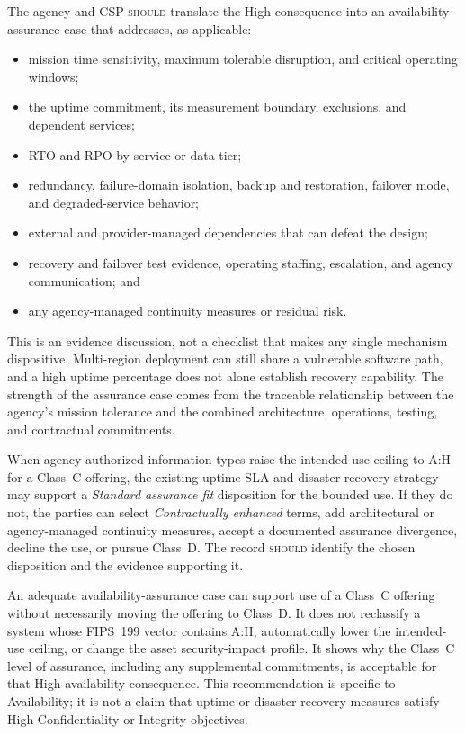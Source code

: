 \documentclass[11pt]{article}
\newcommand{\rfckw}[1]{\textsc{#1}}
\begin{document}
The agency and CSP \rfckw{should} translate the High consequence into an
availability-assurance case that addresses, as applicable:

\begin{itemize}[leftmargin=1.5em]
\item mission time sensitivity, maximum tolerable disruption, and critical
  operating windows;
\item the uptime commitment, its measurement boundary, exclusions, and dependent
  services;
\item RTO and RPO by service or data tier;
\item redundancy, failure-domain isolation, backup and restoration, failover mode,
  and degraded-service behavior;
\item external and provider-managed dependencies that can defeat the design;
\item recovery and failover test evidence, operating staffing, escalation, and
  agency communication; and
\item any agency-managed continuity measures or residual risk.
\end{itemize}

This is an evidence discussion, not a checklist that makes any single mechanism
dispositive. Multi-region deployment can still share a vulnerable software path,
and a high uptime percentage does not alone establish recovery capability. The
strength of the assurance case comes from the traceable relationship between the
agency's mission tolerance and the combined architecture, operations, testing, and
contractual commitments.

When agency-authorized information types raise the intended-use ceiling to A:H for
a Class~C offering, the existing uptime SLA and disaster-recovery strategy may
support a \emph{Standard assurance fit} disposition for the bounded use. If they do
not, the parties can select \emph{Contractually enhanced} terms, add architectural
or agency-managed continuity measures, accept a documented assurance divergence,
decline the use, or pursue Class~D. The record \rfckw{should} identify the chosen
disposition and the evidence supporting it.

An adequate availability-assurance case can support use of a Class~C offering
without necessarily moving the offering to Class~D. It does not reclassify a system
whose FIPS~199 vector contains A:H, automatically lower the intended-use ceiling,
or change the asset security-impact profile. It shows why the Class~C level of assurance,
including any supplemental commitments, is acceptable for that High-availability
consequence. This recommendation is specific to Availability; it is not a claim
that uptime or disaster-recovery measures satisfy High Confidentiality or
Integrity objectives.
\end{document}

